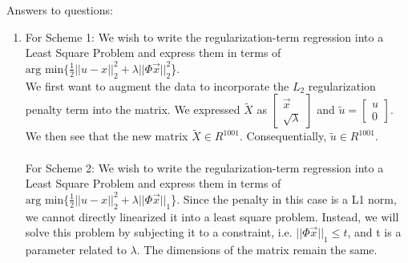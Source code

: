 \documentclass[a4paper]{article}
\begin{document}
Answers to questions:
\begin{enumerate}
\item  
\subitem For Scheme 1:
We wish to write the regularization-term regression into a Least Square Problem and express them in terms of \\ $\text{arg min} \{ \frac{1}{2} || u - x||^2_2 + \lambda || \Phi \vec{x}||^2_2$\}. \\ We first want to augment the data to incorporate the $L_2$ regularization penalty term into the matrix.  We  expressed $\tilde{X}$ as $\begin{bmatrix}
\vec{x} \\ \sqrt{\lambda} \end{bmatrix}$ and $\tilde{u} = \begin{bmatrix}
u \\ 0 \end{bmatrix}$. We then see that the new matrix  $\tilde{X} \in R^{1001}$. Consequentially, $\tilde{u} \in R^{1001}$.  \\

\noindent{} \\ 

\subitem For Scheme 2: We wish to write the regularization-term regression into a Least Square Problem and express them in terms of \\ $\text{arg min} \{ \frac{1}{2} || u - x||^2_2 + \lambda || \Phi \vec{x}||_1 $\}. Since the penalty in this case is a L1 norm, we cannot directly linearized it into a least square problem. Instead, we will solve this problem by subjecting it to a constraint, i.e. $||\Phi\vec{x}||_1 \leq t $, and t is a parameter related to $\lambda $. The dimensions of the matrix remain the same. \\



\noindent\fbox{\begin{minipage}{\textwidth}

\end{minipage}}
\end{enumerate}
\end{document}
